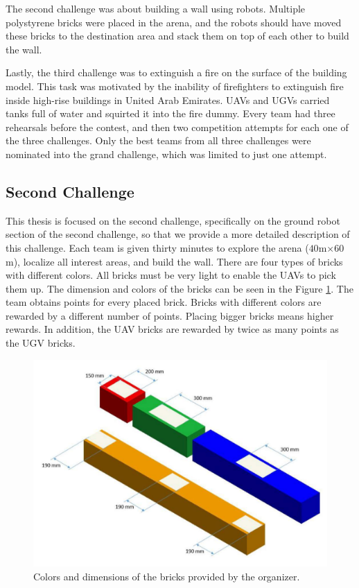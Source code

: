 The second challenge was about building a wall using robots. Multiple polystyrene bricks were placed in the arena, and the robots should have moved these bricks to the destination area and stack them on top of each other to build the wall. 

Lastly, the third challenge was to extinguish a fire on the surface of the building model. This task was motivated by the inability of firefighters to extinguish fire inside high-rise buildings in United Arab Emirates. UAVs and UGVs carried tanks full of water and squirted it into the fire dummy. Every team had three rehearsals before the contest, and then two competition attempts for each one of the three challenges. Only the best teams from all three challenges were nominated into the grand challenge, which was limited to just one attempt.

\subsection{Second Challenge}
This thesis is focused on the second challenge, specifically on the ground robot section of the second challenge, so that we provide a more detailed description of this challenge. Each team is given thirty minutes to explore the arena ($40$m$\times 60$m), localize all interest areas, and build the wall. There are four types of bricks with different colors. All bricks must be very light to enable the UAVs to pick them up. The dimension and colors of the bricks can be seen in the Figure \ref{fig:brickdef}. The team obtains points for every placed brick. Bricks with different colors are rewarded by a different number of points. Placing bigger bricks means higher rewards. In addition, the UAV bricks are rewarded by twice as many points as the UGV bricks.

\begin{figure}[H]

\centering
\includegraphics[scale=0.33]{fig/brick_sample.png}
\caption[Bricks definition]{Colors and dimensions of the bricks provided by the organizer.}
\label{fig:brickdef}

\end{figure}


